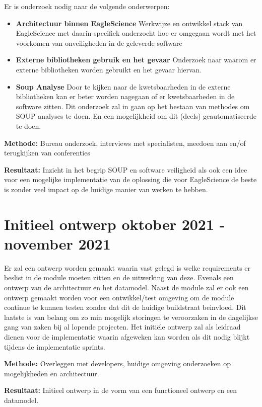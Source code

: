 Er is onderzoek nodig naar de volgende onderwerpen:
\begin{itemize}
    \item \textbf{Architectuur binnen EagleScience} Werkwijze en ontwikkel stack van EagleScience met daarin specifiek onderzocht hoe er omgegaan wordt met het voorkomen van onveiligheden in de geleverde software
    \item \textbf{Externe bibliotheken gebruik en het gevaar} Onderzoek naar waarom er externe bibliotheken worden gebruikt en het gevaar hiervan.
    \item \textbf{Soup Analyse} Door te kijken naar de kwetsbaarheden in de externe bibliotheken kan er beter worden nagegaan of er kwetsbaarheden in de software zitten. Dit onderzoek zal in gaan op het bestaan van methodes om SOUP analyses te doen. En een mogelijkheid om dit (deels) geautomatiseerde te doen.
\end{itemize}

\textbf{Methode:} Bureau onderzoek, interviews met specialisten, meedoen aan en/of terugkijken van conferenties

\textbf{Resultaat:} Inzicht in het begrip SOUP en software veiligheid als ook een idee voor een mogelijke implementatie van de oplossing die voor EagleScience de beste is zonder veel impact op de huidige manier van werken te hebben.

\section{Initieel ontwerp \textbf{oktober 2021 - november 2021 }}\label{sec:initieel-ontwerp}
Er zal een ontwerp worden gemaakt waarin vast gelegd is welke requirements er beslist in de module moeten zitten en de uitwerking van deze. Evenals een ontwerp van de architectuur en het datamodel. Naast de module zal er ook een ontwerp gemaakt worden voor een ontwikkel/test omgeving om de module continue te kunnen testen zonder dat dit de huidige buildstraat beinvloed. Dit laatste is van belang om zo min mogelijk storingen te veroorzaken in de dagelijkse gang van zaken bij al lopende projecten. Het initiële ontwerp zal als leidraad dienen voor de implementatie waarin afgeweken kan worden als dit nodig blijkt tijdens de implementatie sprints.

\textbf{Methode:} Overleggen met developers, huidige omgeving onderzoeken op mogelijkheden en architectuur.

\textbf{Resultaat:} Initieel ontwerp in de vorm van een functioneel ontwerp en een datamodel.


